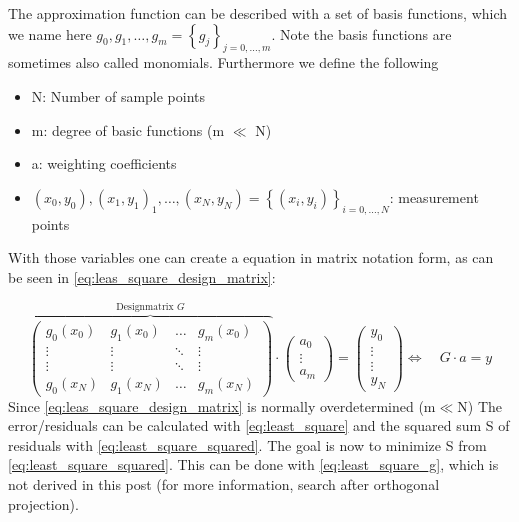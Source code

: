 The approximation function can be described with a set of basis functions, which we name here $g_0, g_1, \ldots, g_m=\left\{g_j\right\}_{j=0, \ldots, m}$. Note the basis functions are sometimes also called  monomials.
Furthermore we define the following
\begin{itemize}
    \item N: Number of sample points
    \item m: degree of basic functions (m $\ll$ N)
    \item a: weighting coefficients
    \item $\left(x_0, y_0\right),\left(x_1, y_1\right)_1, \ldots,\left(x_N, y_N\right)=\left\{\left(x_i, y_i\right)\right\}_{i=0, \ldots, N}$: measurement points
\end{itemize}
With those variables one can create a equation in matrix notation form, as can be seen in \autoref{eq:leas_square_design_matrix}:

\begin{equation}\label{eq:leas_square_design_matrix}
\overbrace{\left(\begin{array}{cccc}
g_{0}\left(x_{0}\right) & g_{1}\left(x_{0}\right) & \ldots & g_{m}\left(x_{0}\right) \\
\vdots & \vdots & \ddots & \vdots \\
\vdots & \vdots & \ddots & \vdots \\
g_{0}\left(x_{N}\right) & g_{1}\left(x_{N}\right) & \ldots & g_{m}\left(x_{N}\right)
\end{array}\right)}^{\text {Designmatrix } G} \cdot\left(\begin{array}{c}
a_{0} \\
\vdots \\
a_{m}
\end{array}\right)=\left(\begin{array}{c}
y_{0} \\
\vdots \\
\vdots \\
y_{N}
\end{array}\right) \Leftrightarrow \quad G \cdot a=y
\end{equation}
Since \autoref{eq:leas_square_design_matrix} is normally overdetermined (m$\ll$N) The error/residuals can be calculated with \autoref{eq:least_square} and the squared sum S of residuals with \autoref{eq:least_square_squared}. The goal is now to minimize S from \autoref{eq:least_square_squared}. This can be done with \autoref{eq:least_square_g}, which is not derived in this post (for more information, search after orthogonal projection).



